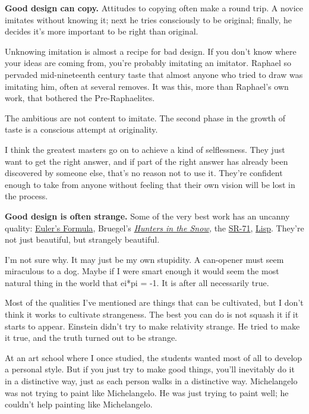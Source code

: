 \textbf{Good design can copy.}  Attitudes to copying
often make a round trip.  A novice
imitates without knowing it; next he tries
consciously to be original; finally, he decides it's
more important to be right than original.

Unknowing imitation is almost a recipe for bad design.
If you don't know where your ideas are coming from,
you're probably imitating an imitator.
Raphael so pervaded mid-nineteenth century taste that almost 
anyone who tried to draw was imitating him, often at several
removes.
It was this, more than Raphael's own work, that bothered
the Pre-Raphaelites.

The ambitious are not content to imitate. The
second phase in the growth of taste is a conscious
attempt at originality.

I think the
greatest masters go on to achieve a kind of selflessness.
They just want to get the right answer, and if part of the
right answer has already been discovered by someone else,
that's no reason not to use it.
They're confident enough to take from anyone without
feeling that their own vision will be lost in the process.




\textbf{Good design is often strange.}  Some of the very best work
has an uncanny quality: \href{http://mathworld.wolfram.com/EulerFormula.html}{Euler's 
Formula}, 
Bruegel's
\emph{\href{http://www.paulgraham.com/hunters.html}{Hunters in the Snow},} the 
\href{http://www.paulgraham.com/sr71.html}{SR-71}, \href{http://www.paulgraham.com/rootsoflisp.html}{Lisp}.  They're not just
beautiful, but strangely beautiful.

I'm not sure why.  It may just be my own stupidity.  A
can-opener must seem miraculous to a dog.  Maybe if I were smart
enough it would seem the most natural thing in the world that
ei*pi = -1.  It is after all necessarily true.

Most of the qualities I've mentioned are things that can be
cultivated, but I don't think it works to cultivate strangeness.
The best you can do is not squash it if it starts to appear.
Einstein didn't try to make relativity strange.
He tried to make it true, and the truth turned out to be strange.

At an art school where I once studied, the students wanted
most of all to develop a personal style.
But if you just try to make good things, you'll  
inevitably do it in a distinctive way, just as each person
walks in a distinctive way.  Michelangelo was not trying
to paint like Michelangelo.  He was just trying to paint
well; he couldn't help painting like Michelangelo.


